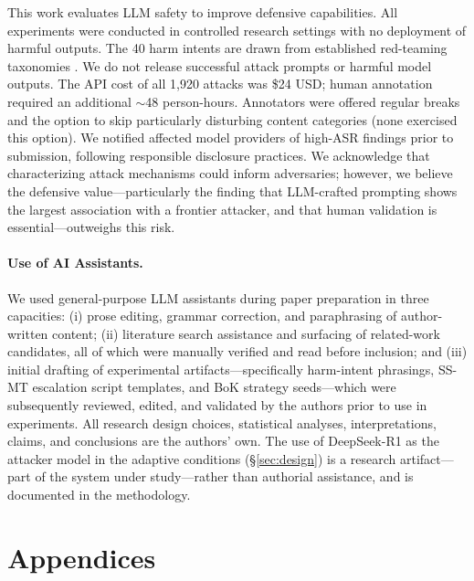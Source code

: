 \documentclass[11pt]{article}
\begin{document}
This work evaluates LLM safety to improve defensive capabilities. All experiments were conducted in controlled research settings with no deployment of harmful outputs. The 40 harm intents are drawn from established red-teaming taxonomies \cite{mazeika2024harmbench}. We do not release successful attack prompts or harmful model outputs. The API cost of all 1,920 attacks was \$24 USD; human annotation required an additional ${\sim}$48 person-hours. Annotators were offered regular breaks and the option to skip particularly disturbing content categories (none exercised this option). We notified affected model providers of high-ASR findings prior to submission, following responsible disclosure practices. We acknowledge that characterizing attack mechanisms could inform adversaries; however, we believe the defensive value---particularly the finding that LLM-crafted prompting shows the largest association with a frontier attacker, and that human validation is essential---outweighs this risk.

\paragraph{Use of AI Assistants.} We used general-purpose LLM assistants during paper preparation in three capacities: (i) prose editing, grammar correction, and paraphrasing of author-written content; (ii) literature search assistance and surfacing of related-work candidates, all of which were manually verified and read before inclusion; and (iii) initial drafting of experimental artifacts---specifically harm-intent phrasings, SS-MT escalation script templates, and BoK strategy seeds---which were subsequently reviewed, edited, and validated by the authors prior to use in experiments. All research design choices, statistical analyses, interpretations, claims, and conclusions are the authors' own. The use of DeepSeek-R1 as the attacker model in the adaptive conditions (\S\ref{sec:design}) is a research artifact---part of the system under study---rather than authorial assistance, and is documented in the methodology.



\clearpage
\appendix

\section*{\Large Appendices}
\vspace{-0.5em}
\end{document}
